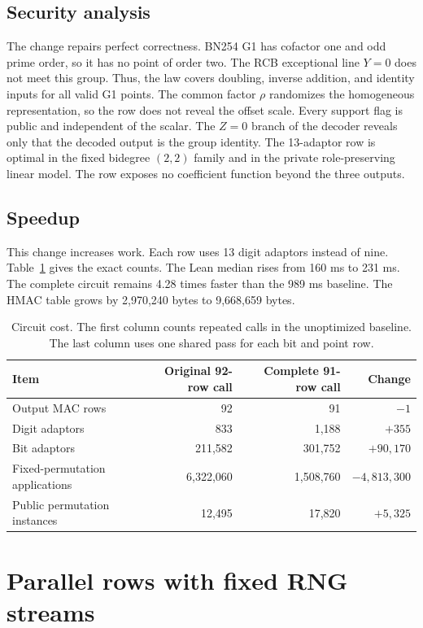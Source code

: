 \documentclass[10pt]{article}
\begin{document}
\subsection{Security analysis}
The change repairs perfect correctness.
BN254 G1 has cofactor one and odd prime order, so it has no point of order two.
The RCB exceptional line $Y=0$ does not meet this group.
Thus, the law covers doubling, inverse addition, and identity inputs for all valid G1 points.
The common factor $\rho$ randomizes the homogeneous representation, so the row does not reveal the offset scale.
Every support flag is public and independent of the scalar.
The $Z=0$ branch of the decoder reveals only that the decoded output is the group identity.
The 13-adaptor row is optimal in the fixed bidegree $(2,2)$ family and in the private role-preserving linear model.
The row exposes no coefficient function beyond the three outputs.

\subsection{Speedup}
This change increases work.
Each row uses 13 digit adaptors instead of nine.
Table~\ref{tab:cost} gives the exact counts.
The Lean median rises from 160 ms to 231 ms.
The complete circuit remains 4.28 times faster than the 989 ms baseline.
The HMAC table grows by 2,970,240 bytes to 9,668,659 bytes.

\begin{table}[h]
\centering
\begin{tabular}{lrrr}
\toprule
Item & Original 92-row call & Complete 91-row call & Change \\
\midrule
Output MAC rows & 92 & 91 & $-1$ \\
Digit adaptors & 833 & 1,188 & $+355$ \\
Bit adaptors & 211,582 & 301,752 & $+90,170$ \\
Fixed-permutation applications & 6,322,060 & 1,508,760 & $-4,813,300$ \\
Public permutation instances & 12,495 & 17,820 & $+5,325$ \\
\bottomrule
\end{tabular}
\caption{Circuit cost. The first column counts repeated calls in the unoptimized baseline. The last column uses one shared pass for each bit and point row.}
\label{tab:cost}
\end{table}

\section{Parallel rows with fixed RNG streams}
\label{sec:o4}
\end{document}
